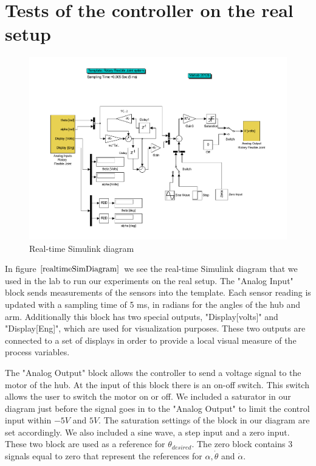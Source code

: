 \documentclass[ twoside,openright,titlepage,numbers=noenddot,headinclude,%
                footinclude=true,cleardoublepage=empty,abstractoff, %
                BCOR=5mm,paper=a4,fontsize=11pt,%
                ngerman,american,%
                ]{scrreprt}
\begin{document}
{\chapter{Tests of the controller on the real setup}

\begin{figure} \label{realtimeSimDiagram}
  \centering
  \includegraphics[scale=0.4]{images/realtimeSimDiagram}
  \caption{Real-time Simulink diagram} 
\end{figure}

In figure $\eqref{realtimeSimDiagram}$ we see the real-time Simulink diagram that we used in the lab to run our experiments on the real setup. The "Analog Input" block sends measurements of the sensors into the template. Each sensor reading is updated with a sampling time of 5 ms, in radians for the angles of the hub and arm. Additionally this block has two special outputs, "Display[volts]" and "Display[Eng]", which are used for visualization purposes. These two outputs are connected to a set of displays in order to provide a local visual measure of the process variables. 

The "Analog Output" block allows the controller to send a voltage signal to the motor of the hub. At the input of this block there is an on-off switch. This switch allows the user to switch the motor on or off. We included a saturator in our diagram just before the signal goes in to the "Analog Output" to limit the control input within $-5V$ and $5V$. The saturation settings of the block in our diagram are set accordingly. We also included a sine wave, a step input and a zero input. These two block are used as a reference for $\theta_{desired}$. The zero block contains 3 signals equal to zero that represent the references for $\alpha, \dot{\theta}$ and $\dot{\alpha}$.


}
\end{document}
